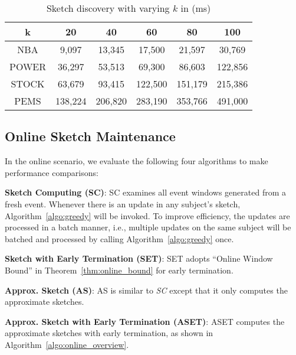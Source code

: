 
{\renewcommand{\arraystretch}{1.2} 
\begin{table}
\small
\centering
\caption{Sketch discovery with varying $k$ in (ms)}\label{exp:offline_greedy}
\begin{tabular}{|c|c|c|c|c|c|}
\hline 
\textbf{k} & \textbf{20} & \textbf{40} & \textbf{60} & \textbf{80}& \textbf{100} \\ 
\hline 
NBA & 9,097 & 13,345	& 17,500	& 21,597 & 	30,769 \\ 
\hline 
POWER & 36,297 & 53,513 & 69,300 &	86,603 &	122,856
\\ 
\hline 
STOCK & 63,679	& 93,415 &	122,500 &	151,179 &	215,386\\ 
\hline 
PEMS & 138,224	& 206,820 &	283,190 &	353,766	& 491,000 \\ 
\hline 
\end{tabular} 
\end{table}
}



\subsection{Online Sketch Maintenance}
\label{subsec:exp-online}
In the online scenario, we evaluate the following four algorithms to make performance comparisons:

\noindent\textbf{Sketch Computing (SC)}: SC examines all event windows generated from a fresh event.  Whenever there is an update in any subject's sketch, Algorithm~\ref{algo:greedy} will be invoked. To improve efficiency, the updates are processed in a batch manner, i.e., multiple updates
on the same subject will be batched and processed by calling Algorithm~\ref{algo:greedy} once.

\noindent\textbf{Sketch with Early Termination (SET)}: SET adopts ``Online Window Bound'' in Theorem~\ref{thm:online_bound} for early termination.

\noindent\textbf{Approx. Sketch (AS)}: AS is similar to \emph{SC} except that it only computes the approximate sketches. 

\noindent\textbf{Approx. Sketch with Early Termination (ASET)}: ASET computes the approximate sketches with early termination, as shown in Algorithm~\ref{algo:online_overview}.

